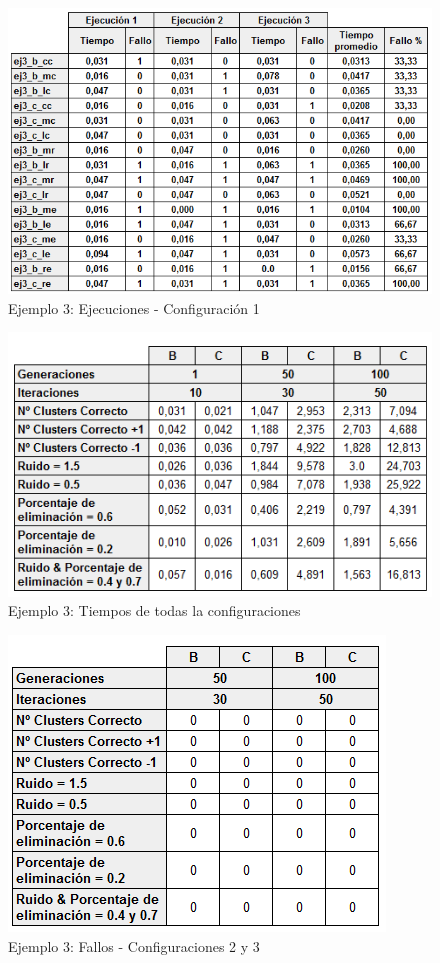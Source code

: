 \documentclass[conference,a4paper]{IEEEtran}
\begin{document}
\begin{figure}[H]
\centering
\includegraphics[scale=0.5]{Experimentacion/Ejemplo3/Ejemplo3Ejecuciones}
\caption{Ejemplo 3: Ejecuciones - Configuración 1\\}
\end{figure}

\begin{figure}[H]
\centering
\includegraphics[scale=0.6]{Experimentacion/Ejemplo3/Ejemplo3Completo}
\caption{Ejemplo 3: Tiempos de todas la configuraciones\\}
\end{figure}

\begin{figure}[H]
\centering
\includegraphics[scale=0.7]{Experimentacion/Ejemplo3/Ejemplo3Fallos}
\caption{Ejemplo 3: Fallos - Configuraciones 2 y 3\\}
\end{figure}
\end{document}
